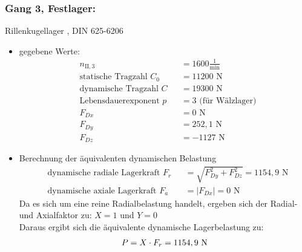 \subsubsection{Gang 3, Festlager:} Rillenkugellager , DIN 625-6206\\
\begin{itemize}
	\item gegebene Werte:
	\begin{align*}
	&n_{{\mathord{\mathrm{II}},3}} &&=  1600 \frac{1}{\text{min}} \\
	&\text{statische Tragzahl } C_{0} &&= 11200 \text{ N}\\
	&\text{dynamische Tragzahl } C &&= 19300 \text{ N} \\
	&\text{Lebensdauerexponent } p &&= 3 \text{ (für Wälzlager)} \\
	&F_{Dx} && = 0\text{ N}\\
	&F_{Dy} && = 252,1 \text{ N}\\
	&F_{Dz} && = -1127 \text{ N}
	\end{align*} 
	\item Berechnung der äquivalenten dynamischen Belastung
	\begin{align*}
	&\text{dynamische radiale Lagerkraft } F_r&& = \sqrt{F_{Dy}^2 + F_{Dz}^2 } = 1154,9 \text{ N} \\
	&\text{dynamische axiale Lagerkraft } F_a&& = |F_{Dx}| = 0 \text{ N}
	\end{align*} 
	Da es sich um eine reine Radialbelastung handelt, ergeben sich der Radial- und Axialfaktor zu: $X= 1$ und $Y=0$\\
	Daraus ergibt sich die äquivalente dynamische Lagerbelastung zu:  
	\[
	P= X \cdot F_r =1154,9 \text{ N}
	\]
\end{itemize}
\newpage
